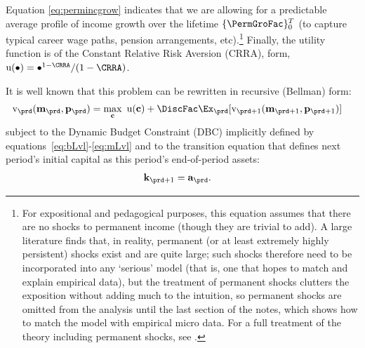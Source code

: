 \documentclass[titlepage, headings=optiontotocandhead]{econtex}
\begin{document}
Equation \eqref{eq:permincgrow} indicates that we are allowing for a predictable average profile of income growth over the lifetime $\{\PermGroFac\}_{0}^{T}$ (to capture typical career wage paths, pension arrangements, etc).\footnote{For expositional and pedagogical purposes, this equation assumes that there are no shocks to permanent income (though they are trivial to add).  A large literature finds that, in reality, permanent (or at least extremely highly persistent) shocks exist and are quite large; such shocks therefore need to be incorporated into any `serious' model (that is, one that hopes to match and explain empirical data), but the treatment of permanent shocks clutters the exposition without adding much to the intuition, so permanent shocks are omitted from the analysis until the last section of the notes, which shows how to match the model with empirical micro data.  For a full treatment of the theory including permanent shocks, see \cite{BufferStockTheory}.}  Finally, the utility function is of the Constant Relative Risk Aversion (CRRA), form, $\mathrm{u}(\bullet) = \bullet^{1-\CRRA}/(1-\CRRA)$.

It is well known that this problem can be rewritten in recursive (Bellman) form:
  \begin{equation}\begin{gathered}\begin{aligned}
        \mathrm{v}_{\prd}(\mathbf{m}_{\prd},\mathbf{p}_{\prd})  & = \max_{\mathbf{c}}~ \mathrm{u}(\mathbf{c}) + \DiscFac \Ex_{\prd}[ \mathrm{v}_{\prd+1}(\mathbf{m}_{\prd+1},\mathbf{p}_{\prd+1})]\label{eq:vrecurse}
      \end{aligned}\end{gathered}\end{equation}
subject to the Dynamic Budget Constraint (DBC) implicitly defined by equations~\eqref{eq:bLvl}-\eqref{eq:mLvl} and to the transition equation that defines next period's initial capital as this period's end-of-period assets:
\begin{equation}\begin{gathered}\begin{aligned}
      \mathbf{k}_{\prd+1} & = \mathbf{a}_{\prd}. \label{eq:transitionstate}
    \end{aligned}\end{gathered}\end{equation}


\hypertarget{normalization}{}
\end{document}
